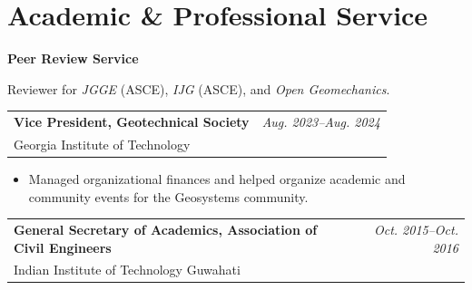 \documentclass[10pt,letterpaper]{article}
\makeatletter
\newcommand{\entry}[3]{%
  \begin{tabularx}{\textwidth}{@{}X r@{}}
    \textbf{#1} & \textit{#3}\\[-1pt]
    \textcolor{midgray}{#2} &
  \end{tabularx}\vspace{-1pt}
}
\makeatother
\begin{document}
\section{Academic \& Professional Service}
\textbf{Peer Review Service}\par
\vspace{2pt}
Reviewer for \textit{JGGE} (ASCE), \textit{IJG} (ASCE), and \textit{Open Geomechanics}.
\vspace{2pt}

\entry{Vice President, Geotechnical Society}{Georgia Institute of Technology}{Aug. 2023--Aug. 2024}
\begin{itemize}
    \item Managed organizational finances and helped organize academic and community events for the Geosystems community.
\end{itemize}
\vspace{2pt}

\entry{General Secretary of Academics, Association of Civil Engineers}{Indian Institute of Technology Guwahati}{Oct. 2015--Oct. 2016}
\end{document}
